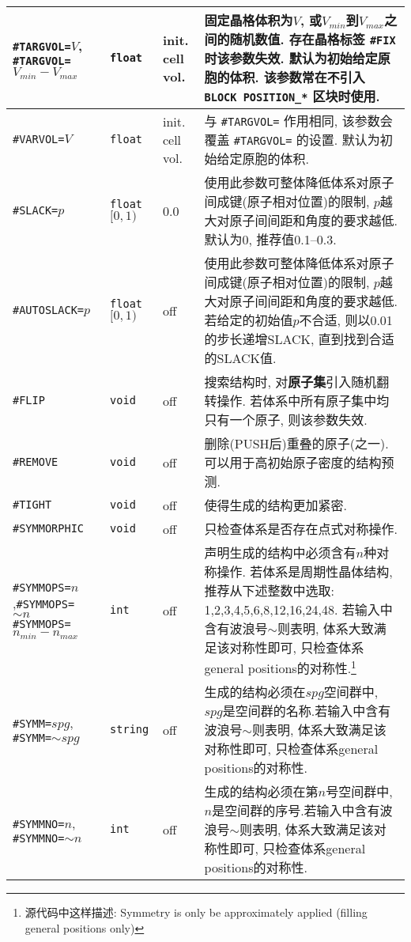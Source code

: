\documentclass[a4paper, 10pt]{article}
\begin{document}
\begin{center}
\begin{longtable}{m{10em}|m{4em}<{\centering}|m{3em}<{\centering}|m{15em}}
\midrule
\verb|#TARGVOL=|\(V\), \verb|#TARGVOL=|\(V_{min}-V_{max}\) & \verb|float| & init. cell vol. & 固定晶格体积为\(V\), 或\(V_{min}\)到\(V_{max}\)之间的随机数值. 存在晶格标签 \verb|#FIX| 时该参数失效. 默认为初始给定原胞的体积. 该参数常在不引入 \verb|BLOCK POSITION_*| 区块时使用.\\
\midrule
\verb|#VARVOL=|\(V\)& \verb|float| & init. cell vol. & 与 \verb|#TARGVOL=| 作用相同, 该参数会覆盖 \verb|#TARGVOL=| 的设置. 默认为初始给定原胞的体积.\\
\midrule
\verb|#SLACK=|\(p\)& \verb|float| \([0,1)\) & 0.0 & 使用此参数可整体降低体系对原子间成键(原子相对位置)的限制, \(p\)越大对原子间间距和角度的要求越低. 默认为0, 推荐值0.1--0.3.\\
\midrule
\verb|#AUTOSLACK=|\(p\)& \verb|float| \([0,1)\) & off & 使用此参数可整体降低体系对原子间成键(原子相对位置)的限制, \(p\)越大对原子间间距和角度的要求越低. 若给定的初始值\(p\)不合适, 则以0.01的步长递增SLACK, 直到找到合适的SLACK值.\\
\midrule
\verb|#FLIP|& \verb|void| & off & 搜索结构时, 对\textbf{原子集}引入随机翻转操作. 若体系中所有原子集中均只有一个原子, 则该参数失效.\\
\midrule
\verb|#REMOVE|& \verb|void| & off & 删除(PUSH后)重叠的原子(之一). 可以用于高初始原子密度的结构预测.\\
\midrule
\verb|#TIGHT|& \verb|void| & off & 使得生成的结构更加紧密.\\
\midrule
\verb|#SYMMORPHIC| & \verb|void| & off & 只检查体系是否存在点式对称操作.\\
\midrule
\verb|#SYMMOPS=|\(n\),\hspace{6em}\verb|#SYMMOPS=|\(\sim{}n\;\;\;\;\;\;\;\;\;\;\;\)\hspace{6em}\verb|#SYMMOPS=|\(n_{min}-n_{max}\) & \verb|int| &  off & 声明生成的结构中必须含有\(n\)种对称操作. 若体系是周期性晶体结构, 推荐从下述整数中选取: 1,2,3,4,5,6,8,12,16,24,48. 若输入中含有波浪号\(\sim\)则表明, 体系大致满足该对称性即可, 只检查体系general positions的对称性.\footnote{源代码中这样描述: Symmetry is only be approximately applied (filling general positions only)}\\
\midrule
\verb|#SYMM=|\(spg\),\hspace{6em} \verb|#SYMM=|\(\sim{}spg\)& \verb|string| & off & 生成的结构必须在\(spg\)空间群中, \(spg\)是空间群的名称.若输入中含有波浪号\(\sim\)则表明, 体系大致满足该对称性即可, 只检查体系general positions的对称性.\\
\midrule
\verb|#SYMMNO=|\(n\),\hspace{6em} \verb|#SYMMNO=|\(\sim{}n\) & \verb|int| & off & 生成的结构必须在第\(n\)号空间群中, \(n\)是空间群的序号.若输入中含有波浪号\(\sim\)则表明, 体系大致满足该对称性即可, 只检查体系general positions的对称性.\\

\end{longtable}
\end{center}
\end{document}
